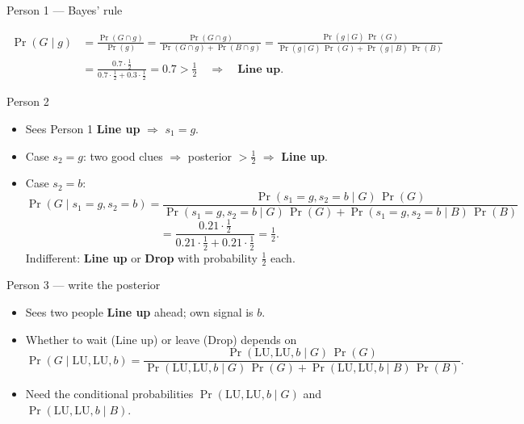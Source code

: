 \documentclass[aspectratio=169,11pt]{beamer}
\begin{document}
\begin{frame}{Person 1 --- Bayes' rule}
\begin{center}
\end{center}
\vspace{0.1em}
\begin{align*}
\Pr(G\mid g)
&=
\frac{\Pr(G\cap g)}{\Pr(g)}
=
\frac{\Pr(G\cap g)}{\Pr(G\cap g)+\Pr(B\cap g)}
=
\frac{\Pr(g\mid G)\,\Pr(G)}{\Pr(g\mid G)\,\Pr(G)+\Pr(g\mid B)\,\Pr(B)}\\[0.25em]
&=
\frac{0.7\cdot\tfrac12}{0.7\cdot\tfrac12+0.3\cdot\tfrac12}
=
0.7
> \tfrac12
\quad\Rightarrow\quad
\textbf{Line up.}
\end{align*}
\end{frame}

\begin{frame}{Person 2}
\begin{itemize}
  \item Sees Person 1 \textbf{Line up} $\Rightarrow$ $s_1=g$.
  \item Case $s_2=g$: two good clues $\Rightarrow$ posterior $> \tfrac12$ $\Rightarrow$ \textbf{Line up}.
  \item Case $s_2=b$:
  \[
  \Pr(G\mid s_1=g,s_2=b)
  =
  \frac{\Pr(s_1=g,s_2=b\mid G)\,\Pr(G)}{\Pr(s_1=g,s_2=b\mid G)\,\Pr(G)+\Pr(s_1=g,s_2=b\mid B)\,\Pr(B)}
  \]
  \[
  =
  \frac{0.21\cdot\tfrac12}{0.21\cdot\tfrac12+0.21\cdot\tfrac12}
  =
  \tfrac12.
  \]
  Indifferent: \textbf{Line up} or \textbf{Drop} with probability $\tfrac12$ each.
\end{itemize}
\end{frame}

\begin{frame}{Person 3 --- write the posterior}
\begin{itemize}
  \item Sees two people \textbf{Line up} ahead; own signal is $b$.
  \item Whether to wait (Line up) or leave (Drop) depends on
  \[
  \Pr(G\mid \mathrm{LU},\mathrm{LU},b)
  =
  \frac{\Pr(\mathrm{LU},\mathrm{LU},b\mid G)\,\Pr(G)}{\Pr(\mathrm{LU},\mathrm{LU},b\mid G)\,\Pr(G)+\Pr(\mathrm{LU},\mathrm{LU},b\mid B)\,\Pr(B)}.
  \]
  \item Need the conditional probabilities $\Pr(\mathrm{LU},\mathrm{LU},b\mid G)$ and $\Pr(\mathrm{LU},\mathrm{LU},b\mid B)$.
\end{itemize}
\end{frame}
\end{document}
